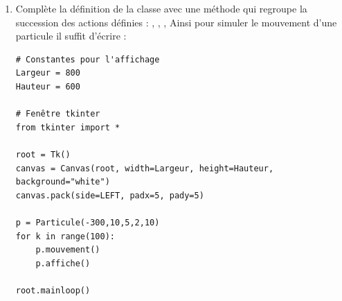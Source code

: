 \documentclass[11pt,class=report,crop=false]{standalone}
\begin{document}
\begin{activite}
\begin{enumerate}
   
  \item Complète la définition de la classe avec une méthode  qui regroupe la succession des actions définies : , , ,  Ainsi pour simuler le mouvement d'une particule il suffit d'écrire : 
  
\begin{lstlisting}
# Constantes pour l'affichage
Largeur = 800
Hauteur = 600

# Fenêtre tkinter
from tkinter import *

root = Tk()      
canvas = Canvas(root, width=Largeur, height=Hauteur, background="white")
canvas.pack(side=LEFT, padx=5, pady=5)

p = Particule(-300,10,5,2,10)
for k in range(100):
    p.mouvement()
    p.affiche()
    
root.mainloop()
\end{lstlisting} 

\end{enumerate} 

\end{activite}




\end{document}
